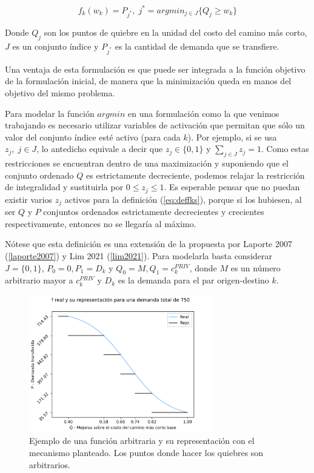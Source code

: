 \documentclass{article}
\begin{document}
  \begin{equation}
    \label{eq:deffks}
    f_k(w_k) = P_{j^*},\; j^* = argmin_{j \in J} \{Q_j \geq w_k\}
  \end{equation}

  Donde $Q_j$ son los puntos de quiebre en la unidad del costo del camino más corto, $J$ es un conjunto índice y $P_{j^*}$ es la cantidad de demanda que se transfiere.

  Una ventaja de esta formulación es que puede ser integrada a la función objetivo de la formulación inicial, de manera que la minimización queda en manos del objetivo del mismo problema.

  Para modelar la función $argmin$ en una formulación como la que venimos trabajando es necesario utilizar variables de activación que permitan que sólo un valor del conjunto índice esté activo (para cada $k$). Por ejemplo, si se usa $z_j,\; j \in J$, lo antedicho equivale a decir que $z_j \in \{0,1\}$ y $\sum_{j \in J} z_j = 1$. Como estas restricciones se encuentran dentro de una maximización y suponiendo que el conjunto ordenado $Q$ es estrictamente decreciente, podemos relajar la restricción de integralidad y sustituirla por $0 \leq z_j \leq 1$. Es esperable pensar que no puedan existir varios $z_j$ activos para la definición (\ref{eq:deffks}), porque si los hubiesen, al ser $Q$ y $P$ conjuntos ordenados estrictamente decrecientes y crecientes respectivamente, entonces no se llegaría al máximo.

  Nótese que esta definición es una extensión de la propuesta por Laporte 2007 (\ref{laporte2007}) y Lim 2021 (\ref{lim2021}). Para modelarla basta considerar $J = \{0, 1\}$, $P_0 = 0, P_1 = D_k$ y $Q_0 = M, Q_1 = c^{PRIV}_k$, donde $M$ es un número arbitrario mayor a $c^{PRIV}_k$ y $D_k$ es la demanda para el par origen-destino $k$.

  \begin{figure}[h!]
    \centering
    \includegraphics[width=8cm]{../resources/f_example.png}
    \caption{Ejemplo de una función arbitraria y su representación con el mecanismo planteado. Los puntos donde hacer los quiebres son arbitrarios.}
    \label{fig:fdrawexample}
  \end{figure}
\end{document}
